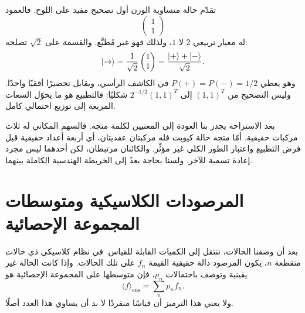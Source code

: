 تقدّم حالة متساوية الوزن أول تصحيح مفيد على اللوح. فالعمود
\begin{equation}
  \begin{pmatrix}1\\1\end{pmatrix}
\end{equation}
له معيار تربيعي \(2\) لا \(1\)، ولذلك فهو غير مُطبَّع. والقسمة على \(\sqrt2\) تصلحه:
\begin{equation}
  \left\lvert\rightarrow\right\rangle
  =
  \frac{1}{\sqrt2}
  \begin{pmatrix}1\\1\end{pmatrix}
  =
  \frac{\left\lvert+\right\rangle+\left\lvert-\right\rangle}{\sqrt2}.
  \label{eq:l02-horizontal-state}
\end{equation}
وهو يعطي \(P(+)=P(-)=1/2\) في الكاشف الرأسي، ويقابل تحضيرًا أفقيًا واحدًا. وليس التصحيح من \((1,1)^T\) إلى \(2^{-1/2}(1,1)^T\) شكليًا: فالتطبيع هو ما يحوّل السعات المربعة إلى توزيع احتمالي كامل.

بعد الاستراحة يجدر بنا العودة إلى المعنيين لكلمة متجه. فالسهم المكاني له ثلاث مركبات حقيقية. أمّا متجه حالة كيوبت فله مركبتان عقديتان، أي أربعة أعداد حقيقية قبل فرض التطبيع واعتبار الطور الكلي غير مؤثِّر. والكائنان مرتبطان، لكن أحدهما ليس مجرد إعادة تسمية للآخر. ولسنا بحاجة بعدُ إلى الخريطة الهندسية الكاملة بينهما.

\begin{classroomqa}
\end{classroomqa}

\section{المرصودات الكلاسيكية ومتوسطات المجموعة الإحصائية}

بعد أن وصفنا الحالات، ننتقل إلى الكميات القابلة للقياس. في نظام كلاسيكي ذي حالات متقطعة \(n\)، يكون المرصود دالة حقيقية القيمة \(f_n\) على تلك الحالات. وإذا كانت الحالة غير يقينية وتوصف باحتمالات \(p_n\)، فإن متوسطها على المجموعة الإحصائية هو
\begin{equation}
  \langle f\rangle_{\mathrm{ens}}
  =\sum_n p_n f_n.
  \label{eq:l02-classical-expectation}
\end{equation}
ولا يعني هذا الترميز أن قياسًا منفردًا لا بد أن يساوي هذا العدد أصلًا.

